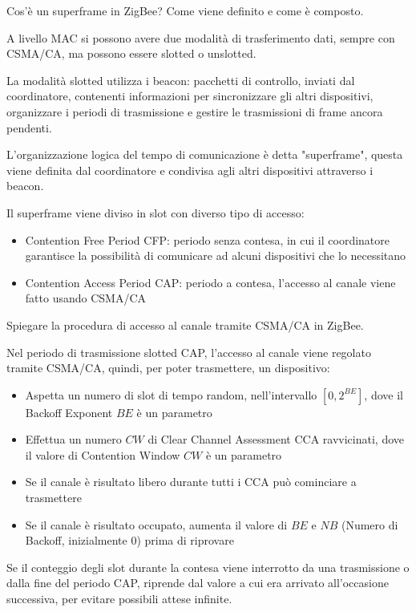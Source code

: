 \begin{questions}
    \question Cos'è un superframe in ZigBee? Come viene definito e come è composto.
    
    \begin{solution}
        A livello MAC si possono avere due modalità di trasferimento dati, sempre con CSMA/CA, ma possono essere slotted o unslotted.
        
        La modalità slotted utilizza i beacon: pacchetti di controllo, inviati dal coordinatore, contenenti informazioni per sincronizzare gli altri dispositivi, organizzare i periodi di trasmissione e gestire le trasmissioni di frame ancora pendenti. 
        
        L'organizzazione logica del tempo di comunicazione è detta "superframe", questa viene definita dal coordinatore e condivisa agli altri dispositivi attraverso i beacon.
        
        Il superframe viene diviso in slot con diverso tipo di accesso: 
        \begin{itemize}
            \item Contention Free Period CFP: periodo senza contesa, in cui il coordinatore garantisce la possibilità di comunicare ad alcuni dispositivi che lo necessitano
            
            \item Contention Access Period CAP: periodo a contesa, l'accesso al canale viene fatto usando CSMA/CA
        \end{itemize}
    \end{solution}
    
    \question Spiegare la procedura di accesso al canale tramite CSMA/CA in ZigBee. 
    
    \begin{solution}
        Nel periodo di trasmissione slotted CAP, l'accesso al canale viene regolato tramite CSMA/CA, quindi, per poter trasmettere, un dispositivo: 
        
        \begin{itemize}
            \item Aspetta un numero di slot di tempo random, nell'intervallo $[0, 2^{BE}]$, dove il Backoff Exponent $BE$ è un parametro
            
            \item Effettua un numero $CW$ di Clear Channel Assessment CCA ravvicinati, dove il valore di Contention Window $CW$ è un parametro
            
            \item Se il canale è risultato libero durante tutti i CCA può cominciare a trasmettere
            
            \item Se il canale è risultato occupato, aumenta il valore di $BE$ e $NB$ (Numero di Backoff, inizialmente 0) prima di riprovare
        \end{itemize}
        Se il conteggio degli slot durante la contesa viene interrotto da una trasmissione o dalla fine del periodo CAP, riprende dal valore a cui era arrivato all'occasione successiva, per evitare possibili attese infinite.
    \end{solution}
\end{questions}